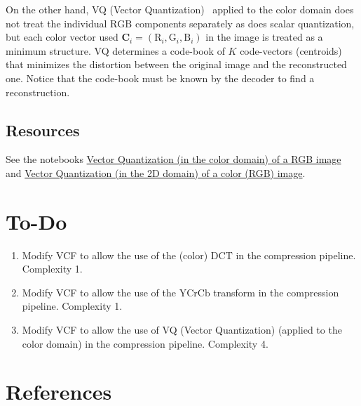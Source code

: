 On the other hand, VQ (Vector
Quantization)~\cite{vruiz__vector_quantization,sayood2017introduction}
applied to the color domain does not treat the individual $\text{RGB}$
components separately as does scalar quantization, but each color
vector used ${\mathbf C}_i = (\text{R}_i, \text{G}_i, \text{B}_i )$ in
the image is treated as a minimum structure. VQ determines a code-book
of $K$ code-vectors (centroids) that minimizes the distortion between
the original image and the reconstructed one. Notice that the
code-book must be known by the decoder to find a reconstruction.

\subsection*{Resources}
See the notebooks
\href{https://github.com/vicente-gonzalez-ruiz/vector_quantization/blob/main/docs/RGB_VQ.ipynb}{Vector
  Quantization (in the color domain) of a RGB image} and
\href{https://github.com/vicente-gonzalez-ruiz/vector_quantization/blob/main/docs/spatial_color_VQ.ipynb}{Vector
  Quantization (in the 2D domain) of a color (RGB) image}.

\section{To-Do}
\begin{enumerate}
\item Modify VCF to allow the use of the (color) $\text{DCT}$ in the
  compression pipeline. Complexity 1.
\item Modify VCF to allow the use of the $\text{YCrCb}$ transform in
  the compression pipeline. Complexity 1.
\item Modify VCF to allow the use of VQ (Vector Quantization) (applied to
  the color domain) in the compression pipeline. Complexity 4.
\end{enumerate}

\section{References}

\renewcommand{\addcontentsline}[3]{}%

